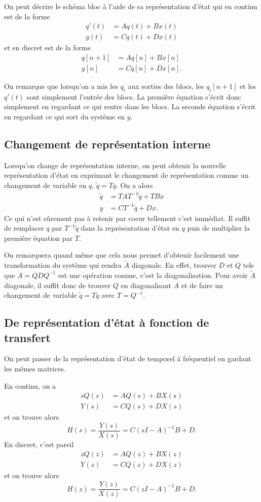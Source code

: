 On peut décrire le schéma bloc à l'aide de sa représentation d'état qui
en continu est de la forme
\begin{align*}
  q'(t) & = Aq(t) + Bx(t)\\
  y(t) & = Cq(t) + Dx(t)
\end{align*}
et en discret est de la forme
\begin{align*}
  q[n+1] & = Aq[n] + Bx[n]\\
  y[n] & = Cq[n] + Dx[n].
\end{align*}

On remarque que lorsqu'on a mis les $q_i$ aux sorties des blocs,
les $q_i[n+1]$ et les $q'(t)$ sont simplement l'entrée des blocs.
La première équation s'écrit donc simplement en regardant ce qui rentre
dans les blocs.
La seconde équation s'écrit en regardant ce qui sort du système en $y$.

\subsection{Changement de représentation interne}
Lorsqu'on change de représentation interne, on peut obtenir
la nouvelle représentation d'état en exprimant le changement de représentation
comme un changement de variable en $q$, $\tilde{q} = Tq$.
On a alors
\begin{align*}
  \tilde{q} & = TAT^{-1}\tilde{q} + TBx\\
  y & = CT^{-1}\tilde{q} + Dx.
\end{align*}
Ce qui n'est sûrement pas à retenir par coeur tellement c'est immédiat.
Il suffit de remplacer $q$ par $T^{-1}\tilde{q}$ dans la représentation d'état
en $q$ puis de multiplier la première équation par $T$.

On remarquera quand même que cela nous permet d'obtenir facilement une
transformation du système qui rendra $\tilde{A}$ diagonale.
En effet, trouver $D$ et $Q$ tels que $A = QDQ^{-1}$ est une opération connue,
c'est la diagonalisation.
Pour avoir $\tilde{A}$ diagonale,
il suffit donc de trouver $Q$ en diagonalisant $A$
et de faire un changement de variable $\tilde{q} = Tq$ avec $T = Q^{-1}$.

\subsection{De représentation d'état à fonction de transfert}
On peut passer de la représentation d'état de temporel à fréquentiel
en gardant les mêmes matrices.

En continu, on a
\begin{align*}
  sQ(s) & = AQ(s) + BX(s)\\
  Y(s) & = CQ(s) + DX(s)
\end{align*}
et on trouve alors
\[ H(s) = \frac{Y(s)}{X(s)} = C(sI-A)^{-1}B + D. \]
En discret, c'est pareil
\begin{align*}
  zQ(z) & = AQ(z) + BX(z)\\
  Y(z) & = CQ(z) + DX(z)
\end{align*}
et on trouve alors
\[ H(z) = \frac{Y(z)}{X(z)} = C(zI-A)^{-1}B + D. \]


